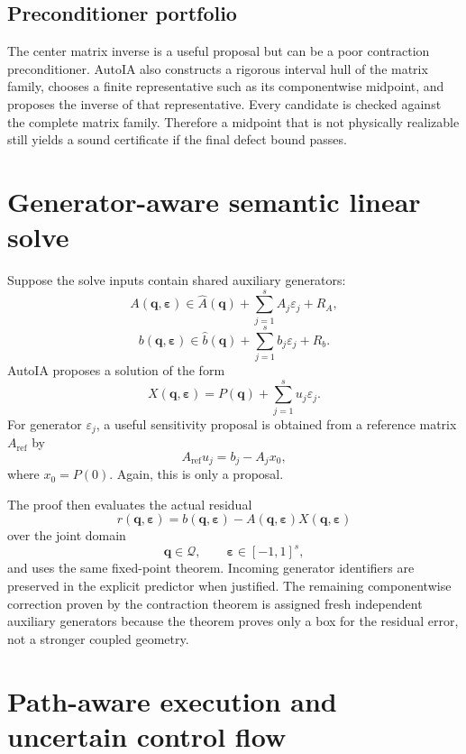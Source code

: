 \documentclass[11pt]{article}
\newcommand{\Qdom}{\mathcal{Q}}
\newcommand{\eps}{\varepsilon}
\newcommand{\epsv}{\boldsymbol{\varepsilon}}
\newcommand{\qv}{\mathbf{q}}
\begin{document}
\subsection{Preconditioner portfolio}

The center matrix inverse is a useful proposal but can be a poor contraction
preconditioner.  AutoIA also constructs a rigorous interval hull of the matrix
family, chooses a finite representative such as its componentwise midpoint, and
proposes the inverse of that representative.  Every candidate is checked against
the complete matrix family.  Therefore a midpoint that is not physically
realizable still yields a sound certificate if the final defect bound passes.

\section{Generator-aware semantic linear solve}

Suppose the solve inputs contain shared auxiliary generators:
\[
  A(\qv,\epsv)
  \in
  \widehat A(\qv)+\sum_{j=1}^s A_j\eps_j+R_A,
\]
\[
  b(\qv,\epsv)
  \in
  \widehat b(\qv)+\sum_{j=1}^s b_j\eps_j+R_b.
\]
AutoIA proposes a solution of the form
\[
  \boxed{
  X(\qv,\epsv)
  =P(\qv)+\sum_{j=1}^s u_j\eps_j.
  }
\]
For generator \(\eps_j\), a useful sensitivity proposal is obtained from a
reference matrix \(A_{\mathrm{ref}}\) by
\[
  A_{\mathrm{ref}}u_j
  =b_j-A_jx_0,
\]
where \(x_0=P(0)\).  Again, this is only a proposal.

The proof then evaluates the actual residual
\[
  r(\qv,\epsv)
  =b(\qv,\epsv)-A(\qv,\epsv)X(\qv,\epsv)
\]
over the joint domain
\[
  \qv\in\Qdom,
  \qquad
  \epsv\in[-1,1]^s,
\]
and uses the same fixed-point theorem.  Incoming generator identifiers are
preserved in the explicit predictor when justified.  The remaining componentwise
correction proven by the contraction theorem is assigned fresh independent
auxiliary generators because the theorem proves only a box for the residual
error, not a stronger coupled geometry.

\section{Path-aware execution and uncertain control flow}
\end{document}
